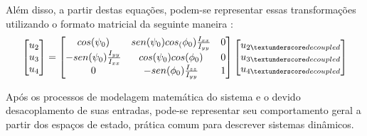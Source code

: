 Além disso, a partir destas equações, podem-se representar essas transformações utilizando o formato matricial da seguinte maneira \cite[p.~62]{Balas2007}:
\[
	\begin{bmatrix}
		u_{2} \\
		u_{3} \\
		u_{4}
	\end{bmatrix} = 
	\begin{bmatrix}
		cos(\psi_0) & sen(\psi_0)cos_(\phi_0)\frac{I_{xx}}{I_{yy}} & 
		0 \\
		
		-sen(\psi_{0})\frac{I_{yy}}{I_{xx}} &
		cos(\psi_{0})cos(\phi_{0}) &
		0 \\
		
		0 &
		-sen(\phi_{0})\frac{I_{zz}}{I_{yy}} &
		1
	\end{bmatrix}
	\begin{bmatrix}
		u_{2\textunderscore decoupled} \\
		u_{3\textunderscore decoupled} \\
		u_{4\textunderscore decoupled}
	\end{bmatrix}
\]

Após os processos de modelagem matemática do sistema e o devido desacoplamento de suas entradas, pode-se representar seu comportamento geral a partir dos espaços de estado, prática comum para descrever sistemas dinâmicos.
